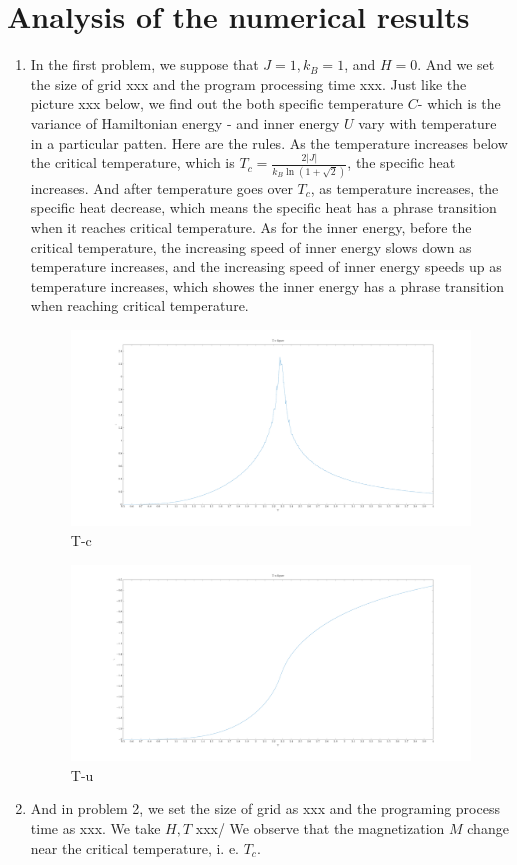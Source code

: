 \documentclass[11pt,openany]{book}              %
\begin{document}
\section{Analysis of the numerical results}
\begin{enumerate}
  \item In the first problem, we suppose that $J = 1, k_B = 1$, and $H = 0$. 
    And we set the size of grid xxx and the program processing time xxx. 
    Just like the picture xxx below, we find out the both specific temperature \(C\)- which is the variance of Hamiltonian energy -  and inner energy \(U\) vary with temperature in a particular patten. Here are the rules.
    As the temperature increases below the critical temperature, which is $T_c =\frac{2 |J|}{k_B \ln ( 1+\sqrt{2})} $, the specific heat increases.
    And after temperature goes over \(T_c\), as temperature increases, the specific heat decrease, which means the specific heat has a phrase transition when it reaches critical temperature.
    As for the inner energy, before the critical temperature, the increasing speed of inner energy slows down as temperature increases, and the increasing speed of inner energy speeds up as temperature increases, which showes the inner energy has a phrase transition when reaching critical temperature.
    
	\begin{figure}\label{fig:Tc}
		\centering
		\includegraphics[width=0.8\linewidth]{Tc.pdf}
		\caption{T-c}
	\end{figure}
  
	\begin{figure}\label{fig:Tu}
		\centering
		\includegraphics[width=0.8\linewidth]{Tu.pdf}
		\caption{T-u}
	\end{figure}
  \item And in problem 2, we set the size of grid as xxx and the programing process time as xxx. We take \(H, T\) xxx/
    We observe that the magnetization \(M\) change near the critical temperature, i. e. \(T_c\).
    

\end{enumerate}
\end{document}

